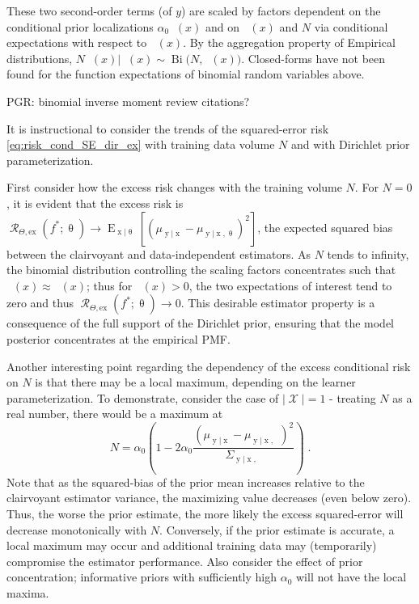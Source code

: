 \documentclass[12pt]{report}
\newcommand{\todohi}[1]{\todo[inline,color=orange!50,linecolor=red]{#1}}
\DeclareMathOperator{\xrm}{\mathrm{x}}
\DeclareMathOperator{\yrm}{\mathrm{y}}
\DeclareMathOperator{\Erm}{\mathrm{E}}
\DeclareMathOperator{\Xcal}{\mathcal{X}}
\DeclareMathOperator{\Rcal}{\mathcal{R}}
\DeclareMathOperator{\Bi}{\mathrm{Bi}}
\DeclareMathOperator{\thetam}{\theta_\text{m}}
\DeclareMathOperator{\upthetam}{\uptheta_\text{m}}
\DeclareMathOperator{\upthetac}{\uptheta_\text{c}}
\DeclareMathOperator{\uppsim}{\uppsi_\text{m}}
\DeclareMathOperator{\alpham}{\alpha_\text{m}}
\begin{document}
These two second-order terms (of $y$) are scaled by factors dependent on the conditional prior localizations $\alpha_0 \alpham(x)$ and on $\upthetam(x)$ and $N$ via conditional expectations with respect to $\uppsim(x)$. By the aggregation property of Empirical distributions, $N \uppsim(x) | \upthetam(x) \sim \Bi \big(N,\upthetam(x)\big)$. Closed-forms have not been found for the function expectations of binomial random variables above.

PGR: binomial inverse moment review citations?


It is instructional to consider the trends of the squared-error risk \eqref{eq:risk_cond_SE_dir_ex} with training data volume $N$ and with Dirichlet prior parameterization.


First consider how the excess risk changes with the training volume $N$. For $N=0$, it is evident that the excess risk is $\Rcal_{\Theta, \mathrm{ex}}(f^* ; \uptheta) \to \Erm_{\xrm | \uptheta}\left[ \left( \mu_{\yrm | \xrm} - \mu_{\yrm | \xrm,\uptheta} \right)^2 \right]$,  the expected squared bias between the clairvoyant and data-independent estimators. As $N$ tends to infinity, the binomial distribution controlling the scaling factors concentrates such that $\uppsim(x) \approx \thetam(x)$; thus for $\thetam(x) > 0$, the two expectations of interest tend to zero and thus $\Rcal_{\Theta, \mathrm{ex}}(f^* ; \uptheta) \to 0$. This desirable estimator property is a consequence of the full support of the Dirichlet prior, ensuring that the model posterior concentrates at the empirical PMF.

Another interesting point regarding the dependency of the excess conditional risk on $N$ is that there may be a local maximum, depending on the learner parameterization. To demonstrate, consider the case of $|\Xcal| = 1$ - treating $N$ as a real number, there would be a maximum at 
\begin{equation}
N = \alpha_0 \left( 1 - 2 \alpha_0 \frac{\left( \mu_{\yrm | \xrm} - \mu_{\yrm | \xrm,\upthetac} \right)^2}{\Sigma_{\yrm | \xrm,\upthetac}} \right) \;.
\end{equation}
\todohi{CHECK, consider x dependency + below}
Note that as the squared-bias of the prior mean increases relative to the clairvoyant estimator variance, the maximizing value decreases (even below zero). Thus, the worse the prior estimate, the more likely the excess squared-error will decrease monotonically with $N$. Conversely, if the prior estimate is accurate, a local maximum may occur and additional training data may (temporarily) compromise the estimator performance. Also consider the effect of prior concentration; informative priors with sufficiently high $\alpha_0$ will not have the local maxima.
\end{document}
